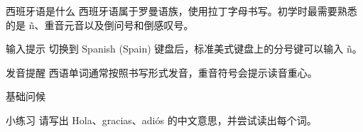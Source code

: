 \documentclass{spanishcards}
\begin{document}

\begin{SpanishTheoryBlock}{西班牙语是什么}
西班牙语属于罗曼语族，使用拉丁字母书写。初学时最需要熟悉的是
ñ、重音元音以及倒问号和倒感叹号。
\end{SpanishTheoryBlock}

\begin{SpanishTipBlock}{输入提示}
切换到 Spanish (Spain) 键盘后，标准美式键盘上的分号键可以输入 ñ。
\end{SpanishTipBlock}

\begin{SpanishNoteBlock}{发音提醒}
西语单词通常按照书写形式发音，重音符号会提示读音重心。
\end{SpanishNoteBlock}

\begin{SpanishExampleBlock}{基础问候}
\end{SpanishExampleBlock}

\begin{SpanishPracticeBlock}{小练习}
请写出 Hola、gracias、adiós 的中文意思，并尝试读出每个词。
\end{SpanishPracticeBlock}


\PrintVocabularyCards
\end{document}
